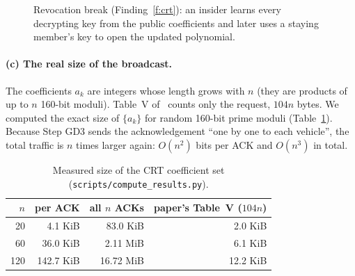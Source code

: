 \begin{figure}[H]
\centering
{}
\caption{Revocation break (Finding~\ref{f:crt}): an insider learns every decrypting key from the public coefficients and later uses a
staying member's key to open the updated polynomial.}
\label{fig:crtattack}
\end{figure}

\paragraph{(c) The real size of the broadcast.}
The coefficients $a_k$ are integers whose length grows with $n$ (they are products of up to $n$ 160-bit moduli). Table~V of~\cite{base} counts only
the request, $104n$ bytes. We computed the exact size of $\{a_k\}$ for random 160-bit prime moduli (Table~\ref{tab:crtsize}). Because Step GD3 sends
the acknowledgement ``one by one to each vehicle'', the total traffic is $n$ times larger again: $O(n^2)$ bits per ACK and $O(n^3)$ in total.

\begin{table}[H]
\centering\small
\caption{Measured size of the CRT coefficient set (\texttt{scripts/compute\_results.py}).}
\label{tab:crtsize}
\begin{tabular}{@{}rrrr@{}}
\toprule
$n$ & per ACK & all $n$ ACKs & paper's Table~V ($104n$) \\
\midrule
 20 &   4.1 KiB &  83.0 KiB &  2.0 KiB \\
 60 &  36.0 KiB &   2.11 MiB &  6.1 KiB \\
120 & 142.7 KiB &  16.72 MiB & 12.2 KiB \\
\bottomrule
\end{tabular}
\end{table}

